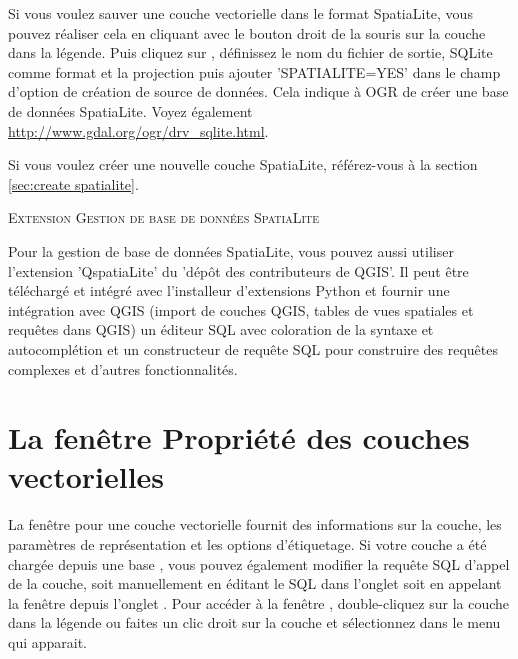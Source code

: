 Si vous voulez sauver une couche vectorielle dans le format SpatiaLite, vous 
pouvez réaliser cela en cliquant avec le bouton droit de la souris sur 
la couche dans la légende. Puis cliquez sur , 
définissez le nom du fichier de sortie, SQLite comme format et la projection 
puis ajouter 'SPATIALITE=YES' dans le champ d'option de création de source 
de données. Cela indique à OGR de créer une base de données SpatiaLite. 
Voyez également \url{http://www.gdal.org/ogr/drv_sqlite.html}.


Si vous voulez créer une nouvelle couche SpatiaLite, référez-vous à la section 
\ref{sec:create spatialite}.

\begin{Tip}\caption{\textsc{Extension Gestion de base de données SpatiaLite}} 
Pour la gestion de base de données SpatiaLite, vous pouvez aussi utiliser 
l'extension 'QspatiaLite' du 'dépôt des contributeurs de QGIS'. Il peut 
être téléchargé et intégré avec l'installeur d'extensions Python et 
fournir une intégration avec QGIS (import de couches QGIS, tables de vues 
spatiales et requêtes dans QGIS) un éditeur SQL avec coloration de la syntaxe 
et autocomplétion et un constructeur de requête SQL pour construire des 
requêtes complexes et d'autres fonctionnalités.
\end{Tip}

\section{La fenêtre Propriété des couches vectorielles}\label{sec:vectorprops}

La fenêtre  pour une couche vectorielle 
fournit des informations sur la couche, les paramètres de représentation 
et les options d'étiquetage. Si votre couche a été chargée depuis une 
base \ppg, vous pouvez également modifier la requête SQL d'appel de la 
couche, soit manuellement en éditant le SQL dans l'onglet  
soit en appelant la fenêtre  depuis 
l'onglet . Pour accéder à la fenêtre , double-cliquez sur la couche dans la légende ou faites 
un clic droit sur la couche et sélectionnez  
dans le menu qui apparait.

